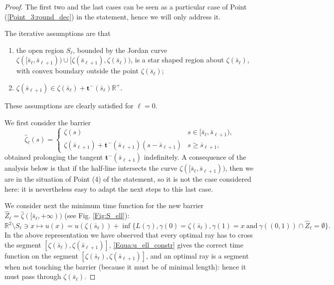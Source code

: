 \documentclass[reqno]{amsart}
\newcounter{assu}
\theoremstyle{definition} \newtheorem{definition}{Definition}[section]
\theoremstyle{definition} \newtheorem{remark}[definition]{Remark}
\theoremstyle{plain} \newtheorem{lemma}[definition]{Lemma}
\theoremstyle{plain} \newtheorem{proposition}[definition]{Proposition}
\theoremstyle{plain} \newtheorem{theorem}[definition]{Theorem}
\theoremstyle{plain} \newtheorem{corollary}[definition]{Corollary}
\theoremstyle{definition} \newtheorem{example}[definition]{Example}
\theoremstyle{plain} \newtheorem{claim}[clai]{Claim}
\theoremstyle{definition} \newtheorem{assumption}[definition]{Assumption}
\theoremstyle{definition} \newtheorem{observation}[definition]{Observation}
\newcommand{\R}{\mathbb{R}}
\newcommand{\1}{\mathbbm 1}
\numberwithin{equation}{section} %
\theoremstyle{plain} \newtheorem*{theorem*}{Theorem}
\theoremstyle{plain} \newtheorem{mthm}[maintheorem]{Main Theorem}
\theoremstyle{plain} \newtheorem*{mthm*}{Main Theorem}
\theoremstyle{plain} \newtheorem*{conjecture*}{Conjecture}
\theoremstyle{plain} \newtheorem{conjecture}[definition]{Conjecture}
\theoremstyle{plain} \newtheorem*{problem*}{Problem}
\begin{document}
\begin{proof}
The first two and the last cases can be seen as a particular case of Point (\ref{Point_3:round_dec}) in the statement, hence we will only address it.

The iterative assumptions are that
\begin{enumerate}
\item the open region $S_\ell$, bounded by the Jordan curve $\zeta([\bar s_\ell,\bar s_{\ell+1})) \cup [\zeta(\bar s_{\ell+1}),\zeta(\bar s_\ell))$, is a star shaped region about $\zeta(\bar s_\ell)$, with convex boundary outside the point $\zeta(\bar s_\ell)$;
\item $\zeta(\bar s_{\ell+1}) \in \zeta(\bar s_\ell) + \mathbf t^-(\bar s_\ell) \R^+$.
\end{enumerate}
These assumptions are clearly satisfied for $\ell = 0$.

\medskip

 We first consider the barrier
\begin{equation*}
\hat \zeta_\ell(s) = \begin{cases}
\zeta(s) & s \in [\bar s_\ell,\bar s_{\ell+1}), \\
\zeta(\bar s_{\ell+1}) + \mathbf t^-(\bar s_{\ell+1}) (s - \bar s_{\ell+1}) & s \geq \bar s_{\ell+1},
\end{cases}
\end{equation*}
obtained prolonging the tangent $\mathbf t^-(\bar s_{\ell+1})$ indefinitely. A consequence of the analysis below is that if the half-line intersects the curve $\zeta([\bar s_\ell,\bar s_{\ell+1}))$, then we are in the situation of Point (4) of the statement, so it is not the case considered here: it is nevertheless easy to adapt the next steps to this last case.

We consider next the minimum time function for the new barrier $\hat Z_\ell = \hat \zeta([\bar s_\ell,+\infty))$ (see Fig. \ref{Fig:S_ell}):
\begin{equation}
\label{Equa:u_ell_constr}
\R^2 \setminus S_\ell \ni x \mapsto u(x) = u(\zeta(\bar s_\ell)) + \inf \Big\{ L(\gamma), \gamma(0) = \zeta(\bar s_\ell), \gamma(1) = x \ \text{and} \ \gamma((0,1)) \cap \hat Z_\ell = \emptyset \Big\}.
\end{equation}
In the above representation we have observed that every optimal ray has to cross the segment $[\zeta(\bar s_\ell),\zeta(\bar s_{\ell+1})]$, \eqref{Equa:u_ell_constr} gives the correct time function on the segment $[\zeta(\bar s_\ell),\zeta(\bar s_{\ell+1})]$, and an optimal ray is a segment when not touching the barrier (because it must be of minimal length): hence it must pass through $\zeta(\bar s_\ell)$.


\end{proof}
\end{document}
